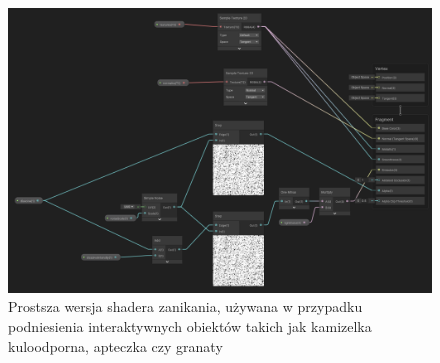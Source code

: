 \begin{figure}[h]
    \centering
    \includegraphics[width=1\linewidth]{Images/dissolve.png}
    \caption{Prostsza wersja shadera zanikania, używana w przypadku podniesienia interaktywnych obiektów takich jak kamizelka kuloodporna, apteczka czy granaty}
\end{figure}
\FloatBarrier